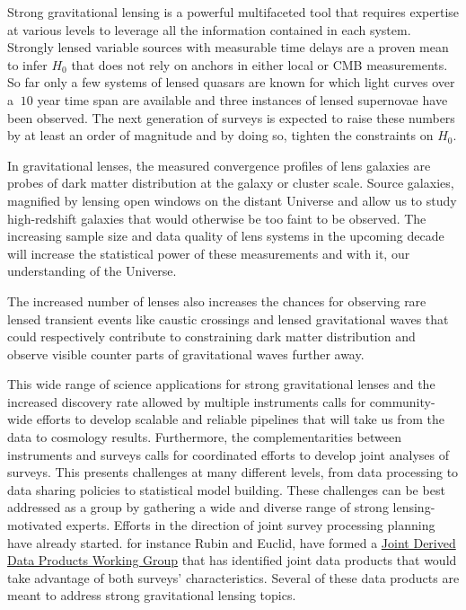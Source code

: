\documentclass[11pt, letterpaper]{article}
\begin{document}
    Strong gravitational lensing is a powerful multifaceted tool that requires expertise at various levels to leverage all the information contained in each system.
    Strongly lensed variable sources with measurable time delays are a proven mean to infer $H_0$ that does not rely on anchors in either local or CMB measurements. So far only a few systems of lensed quasars are known for which light curves over a $~10$ year time span are available and three instances of lensed supernovae have been observed. The next generation of surveys is expected to raise these numbers by at least an order of magnitude and by doing so, tighten the constraints on $H_0$. 
    
    In gravitational lenses, the measured convergence profiles of lens galaxies are probes of dark matter distribution at the galaxy or cluster scale. 
    Source galaxies, magnified by lensing open windows on the distant Universe and allow us to study high-redshift galaxies that would otherwise be too faint to be observed. 
    The increasing sample size and data quality of lens systems in the upcoming decade will increase the statistical power of these measurements and with it, our understanding of the Universe.
    
    The increased number of lenses also increases the chances for observing rare lensed transient events like caustic crossings and lensed gravitational waves that could respectively contribute to constraining dark matter distribution and observe visible counter parts of gravitational waves further away.
    
    This wide range of science applications for strong gravitational lenses and the increased discovery rate allowed by multiple instruments calls for community-wide efforts to develop scalable and reliable pipelines that will take us from the data to cosmology results. Furthermore, the complementarities between instruments and surveys calls for coordinated efforts to develop joint analyses of surveys. This presents challenges at many different levels, from data processing to data sharing policies to statistical model building. These challenges can be best addressed as a group by gathering a wide and diverse range of strong lensing-motivated experts. Efforts in the direction of joint survey processing planning have already started. for instance  Rubin and Euclid, have formed a \href{https://www.lsst.org/news/rubin-meets-euclid-towards-joint-derived-data-products-working-group}{Joint Derived Data Products Working Group} that has identified joint data products that would take advantage of both surveys' characteristics. Several of these data products are meant to address strong gravitational lensing topics.
    
\end{document}
